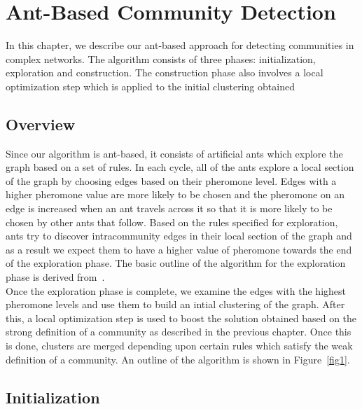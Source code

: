 \chapter{Ant-Based Community Detection}
\begin{spacing}{1.5}
In this chapter, we describe our ant-based approach for detecting communities in complex networks. The algorithm consists of three phases: initialization, exploration and construction. The construction phase also involves a local optimization step which is applied to the initial clustering obtained 

\section{Overview}

Since our algorithm is ant-based, it consists of artificial ants which explore the graph based on a set of rules. In each cycle, all of the ants explore a local section of the graph by choosing edges based on their pheromone level. Edges with a higher pheromone value are more likely to be chosen and the pheromone on an edge is increased when an ant travels across it so that it is more likely to be chosen by other ants that follow. Based on the rules specified for exploration, ants try to discover intracommunity edges in their local section of the graph and as a result we expect them to have a higher value of pheromone towards the end of the exploration phase. The basic outline of the algorithm for the exploration phase is derived from~\cite{5910378}.  \\
\indent Once the exploration phase is complete, we examine the edges with the highest pheromone levels and use them to build an intial clustering of the graph. After this, a local optimization step is used to boost the solution obtained based on the strong definition of a community as described in the previous chapter. Once this is done, clusters are merged depending upon certain rules which satisfy the weak definition of a community. An outline of the algorithm is shown in Figure~\ref{fig1}.


\section{Initialization}


\end{spacing}
